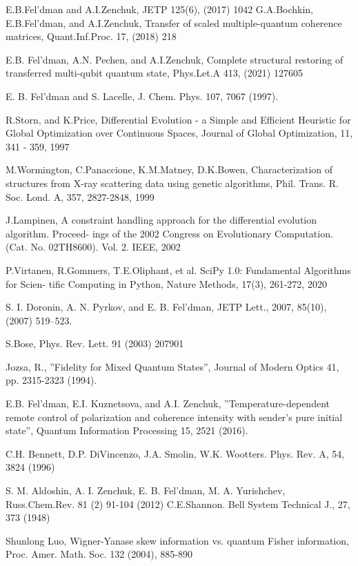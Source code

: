 \begin{thebibliography}{}
 E.B.Fel'dman and A.I.Zenchuk, JETP 125(6), (2017) 1042
 G.A.Bochkin, E.B.Fel’dman, and A.I.Zenchuk, Transfer of scaled multiple-quantum coherence matrices, Quant.Inf.Proc. 17, (2018) 218

 E.B. Fel'dman, A.N. Pechen, and A.I.Zenchuk, Complete structural restoring of transferred multi-qubit quantum state, Phys.Let.A 413, (2021) 127605

 E. B. Fel'dman and S. Lacelle, J. Chem. Phys. 107, 7067 (1997).

 R.Storn, and K.Price, Differential Evolution - a Simple and Efficient Heuristic for Global
Optimization over Continuous Spaces, Journal of Global Optimization, 11, 341 - 359, 1997

 M.Wormington, C.Panaccione, K.M.Matney, D.K.Bowen, Characterization of structures from
X-ray scattering data using genetic algorithms, Phil. Trans. R. Soc. Lond. A, 357, 2827-2848, 1999

 J.Lampinen, A constraint handling approach for the differential evolution algorithm. Proceed-
ings of the 2002 Congress on Evolutionary Computation. (Cat. No. 02TH8600). Vol. 2. IEEE, 2002

 P.Virtanen, R.Gommers, T.E.Oliphant, et al. SciPy 1.0: Fundamental Algorithms for Scien-
tific Computing in Python, Nature Methods, 17(3), 261-272, 2020

 S. I. Doronin, A. N. Pyrkov, and E. B. Fel'dman, JETP Lett., 2007, 85(10), (2007) 519–523.

 S.Bose, Phys. Rev. Lett. 91 (2003) 207901

 Jozsa, R., ”Fidelity for Mixed Quantum States”, Journal of Modern Optics 41, pp. 2315-2323 (1994).

 E.B. Fel'dman, E.I. Kuznetsova, and A.I. Zenchuk, ”Temperature-dependent remote control of polarization and coherence intensity with sender’s pure initial state”, Quantum Information Processing 15, 2521 (2016).

 C.H. Bennett, D.P. DiVincenzo, J.A. Smolin, W.K. Wootters.
Phys. Rev. A, 54, 3824 (1996)

  S. M. Aldoshin, A. I. Zenchuk, E. B. Fel'dman, M. A. Yurishchev, Russ.Chem.Rev. 81 (2) 91-104 (2012)
 C.E.Shannon. Bell System Technical J., 27, 373 (1948)

 Shunlong Luo, Wigner-Yanase skew information vs. quantum Fisher information, Proc. Amer. Math. Soc. 132 (2004), 885-890

\end{thebibliography}